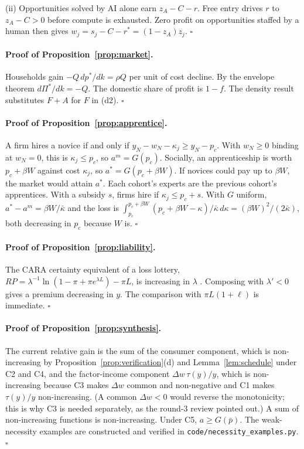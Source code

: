 \documentclass[12pt]{article}
\theoremstyle{remark}
\begin{document}
(ii) Opportunities solved by AI alone earn $z_A-C-r$. Free entry drives $r$ to $z_A-C>0$ before compute is exhausted. Zero profit on opportunities staffed by a human then gives $w_j=s_j-C-r^*=(1-z_A)z_j$. $\square$

\paragraph{Proof of Proposition~\ref{prop:market}.} Households gain $-Q\,dp^*/dk=\rho Q$ per unit of cost decline. By the envelope theorem $d\Pi^*/dk=-Q$. The domestic share of profit is $1-f$. The density result substitutes $F+A$ for $F$ in (d2). $\square$

\paragraph{Proof of Proposition~\ref{prop:apprentice}.} A firm hires a novice if and only if $y_N-w_N-\kappa_j\ge y_N-p_c$. With $w_N\ge0$ binding at $w_N=0$, this is $\kappa_j\le p_c$, so $a^m=G(p_c)$. Socially, an apprenticeship is worth $p_c+\beta W$ against cost $\kappa_j$, so $a^*=G(p_c+\beta W)$. If novices could pay up to $\beta W$, the market would attain $a^*$. Each cohort's experts are the previous cohort's apprentices. With a subsidy $s$, firms hire if $\kappa_j\le p_c+s$. With $G$ uniform, $a^*-a^m=\beta W/\bar\kappa$ and the loss is $\int_{p_c}^{p_c+\beta W}(p_c+\beta W-\kappa)/\bar\kappa\,d\kappa=(\beta W)^2/(2\bar\kappa)$, both decreasing in $p_c$ because $W$ is. $\square$

\paragraph{Proof of Proposition~\ref{prop:liability}.} The CARA certainty equivalent of a loss lottery, $RP=\lambda^{-1}\ln(1-\pi+\pi e^{\lambda L})-\pi L$, is increasing in $\lambda$ \citep{pratt1964risk}. Composing with $\lambda'<0$ gives a premium decreasing in $y$. The comparison with $\pi L(1+\ell)$ is immediate. $\square$

\paragraph{Proof of Proposition~\ref{prop:synthesis}.} The current relative gain is the sum of the consumer component, which is non-increasing by Proposition~\ref{prop:verification}(d) and Lemma~\ref{lem:schedule} under C2 and C4, and the factor-income component $\Delta w\,\tau(y)/y$, which is non-increasing because C3 makes $\Delta w$ common and non-negative and C1 makes $\tau(y)/y$ non-increasing. (A common $\Delta w<0$ would reverse the monotonicity; this is why C3 is needed separately, as the round-3 review pointed out.) A sum of non-increasing functions is non-increasing. Under C5, $a\ge G(\bar p)$. The weak-necessity examples are constructed and verified in \texttt{code/necessity\_examples.py}. $\square$
\end{document}
